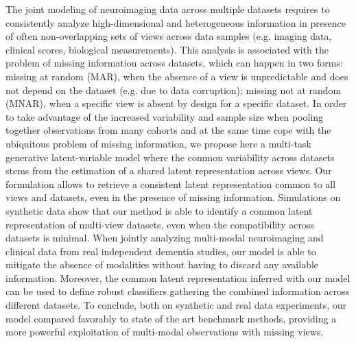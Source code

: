 The joint modeling of neuroimaging data across multiple datasets requires to consistently analyze high-dimensional and heterogeneous information in presence of often non-overlapping sets of views across data samples (e.g. imaging data, clinical scores, biological measurements).
This analysis is associated with the problem of missing information across datasets, which can happen in two forms:
missing at random (MAR), when the absence of a view is unpredictable and does not depend on the dataset (e.g. due to data corruption);
missing not at random (MNAR), when a specific view is absent by design for a specific dataset.
%
In order to take advantage of the increased variability and sample size when pooling together observations from many cohorts
and at the same time cope with the ubiquitous problem of missing information,
we propose here a multi-task generative latent-variable model where the common variability across datasets stems from the estimation of a shared latent representation across views.
Our formulation allows to retrieve a consistent latent representation common to all views and datasets, even in the presence of missing information.
%
Simulations on synthetic data show that our method is able to identify a common latent representation of multi-view datasets, even when the compatibility across datasets is minimal.
%
When jointly analyzing multi-modal neuroimaging and clinical data from real independent dementia studies, our model is able to mitigate the absence of modalities without having to discard any available information.
Moreover, the common latent representation inferred with our model can be used to define robust classifiers gathering the combined information across different datasets.
%
To conclude, both on synthetic and real data experiments, our model compared favorably to state of the art benchmark methods, providing a more powerful exploitation of multi-modal observations with missing views.
